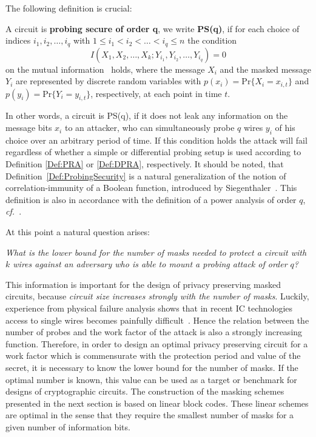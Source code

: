 \documentclass[11pt]{llncs}
\newcommand{\BDEF}{\begin{definition}}  \newcommand{\EDEF}{\end{definition}}
\newcommand{\cf}{{\it cf.\ }}
\begin{document}
The following definition is crucial:
\BDEF\label{Def:ProbingSecurity}
A circuit is \textbf{probing secure of order q}, we write \textbf{PS(q)},
if for each choice of
indices $i_1,i_2,\dots,i_q$ with $1\le i_1 < i_2 < \dots < i_q \le n$
the condition
\[
    I(X_{1},X_{2},\dots,X_{k}; Y_{i_1},Y_{i_2},\dots,Y_{i_q}) = 0
\]
on the mutual information~\cite{Cover2006ElementsofInformation} holds,
where the message $X_i$ and the masked message $Y_i$ are
represented by discrete random variables
with $p(x_i) = \mathrm{Pr}\{X_i=x_{i,t}\}$
and  $p(y_i) = \mathrm{Pr}\{Y_i=y_{i,t}\}$,
respectively, at each point in time $t$.
\EDEF
In other words, a circuit is PS(q), if it does not leak any information
on the message bits $x_i $ to an attacker,
who can simultaneously probe $q$ wires $y_i$ of his choice
over an arbitrary period of time.
If this condition holds the attack will fail regardless of
whether a simple or differential probing setup is used
according to Definition \ref{Def:PRA} or \ref{Def:DPRA}, respectively.
It should be noted, that Definition~\ref{Def:ProbingSecurity}
is a natural generalization of the
notion of correlation-immunity of a Boolean function, introduced
by Siegenthaler~\cite{Siegenthaler1984Correlation-immunityofnonlinear}.
This definition is also in accordance with the definition
of a power analysis of order $q$, \cf\cite{Mangard2007PowerAnalysisAttacks}.

At this point a natural question arises:
\begin{center}
\begin{minipage}{0.83\textwidth}
 \em What is the lower bound for the number of masks needed to protect
     a circuit with $k$ wires against an adversary who is able to
     mount a probing attack of order $q$?
 \end{minipage}
\end{center}
This information is important for the design of privacy preserving masked
circuits, because \emph{circuit size increases strongly with the number of masks}.
Luckily, experience from physical failure analysis shows that in recent
IC technologies access to single wires
becomes painfully difficult~\cite{Boit2008PhysicalTechniquesChip-Backside}.
Hence the relation between the number of probes and the work factor
of the attack is also a strongly increasing function.
Therefore, in order to design an optimal privacy preserving circuit for a work factor
which is commensurate with the protection period and value of the secret,
it is necessary to know the lower bound for the number of masks.
If the optimal number is known, this value can be used as a target or benchmark
for designs of cryptographic circuits.
The construction of the masking schemes presented in the next section
is based on linear block codes.
These linear schemes are optimal in the sense that they require the
smallest number of masks for a given number of information bits.
\end{document}
